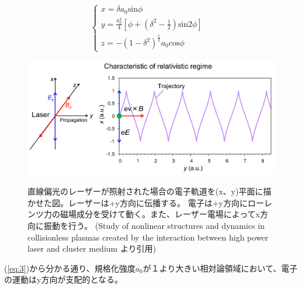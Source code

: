 \documentclass[a4paper,11pt,titlepage]{jsarticle}
\begin{document}
  \begin{equation}
    \label{eq:3}
      \left\{
        \begin{array}{ll}
          x = \delta a_0 \textrm{sin}\phi & \\
          y = \frac{a_0^2}{4}[\phi + (\delta^2 - \frac{1}{2})\textrm{sin2}\phi ] & \\
          z = -(1-\delta^2)^{\frac{1}{2}} a_0 \textrm{cos}\phi 
        \end{array}
      \right.
    \end{equation}
  \begin{figure}[H]
    \begin{center}
      \includegraphics[keepaspectratio,width=\linewidth]{./image/2-1/2-1_propagation.png}
      \label{}
      \caption{
        直線偏光のレーザーが照射された場合の電子軌道を(x、y)平面に描かせた図。レーザーは+y方向に伝播する。
        電子は+y方向にローレンツ力の磁場成分を受けて動く。また、レーザー電場によってx方向に振動を行う。
        (Study of nonlinear structures and dynamics in collisionless plasmas created by the 
        interaction between high power laser and cluster medium より引用)
      }
    \end{center}
  \end{figure}   
  (\ref{eq:3})から分かる通り、規格化強度$a_0$が１より大きい相対論領域において、電子の運動はy方向が支配的となる。
\end{document}
